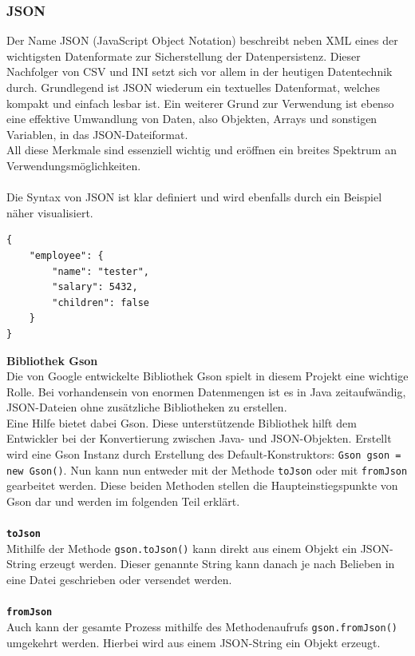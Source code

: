 \subsubsection{JSON}\label{sssec:json}
Der Name JSON (JavaScript Object Notation) beschreibt neben XML eines der wichtigsten Datenformate zur Sicherstellung der Datenpersistenz.
Dieser Nachfolger von CSV und INI setzt sich vor allem in der heutigen Datentechnik durch.
Grundlegend ist JSON wiederum ein textuelles Datenformat, welches kompakt und einfach lesbar ist.
Ein weiterer Grund zur Verwendung ist ebenso eine effektive Umwandlung von Daten, also Objekten, Arrays und sonstigen Variablen, in das JSON-Dateiformat.\\
All diese Merkmale sind essenziell wichtig und eröffnen ein breites Spektrum an Verwendungsmöglichkeiten.\\\\
\newpage
Die Syntax von JSON ist klar definiert und wird ebenfalls durch ein Beispiel näher visualisiert.
\begin{lstlisting}[style=json, caption=JSON-Codebeispiel,label=jsonExample]
{
    "employee": {
        "name": "tester",
        "salary": 5432,
        "children": false
    }
}
\end{lstlisting}
\textbf{Bibliothek Gson}\\
Die von Google entwickelte Bibliothek Gson spielt in diesem Projekt eine wichtige Rolle.
Bei vorhandensein von enormen Datenmengen ist es in Java zeitaufwändig, JSON-Dateien ohne zusätzliche Bibliotheken zu erstellen.\\
Eine Hilfe bietet dabei Gson.
Diese unterstützende Bibliothek hilft dem Entwickler bei der Konvertierung zwischen Java- und JSON-Objekten.
Erstellt wird eine Gson Instanz durch Erstellung des Default-Konstruktors: \lstinline[style=java]{Gson gson = new Gson()}.
Nun kann nun entweder mit der Methode \lstinline{toJson} oder mit \lstinline{fromJson} gearbeitet werden.
Diese beiden Methoden stellen die Haupteinstiegspunkte von Gson dar und werden im folgenden Teil erklärt.
\\\\
\textbf{\lstinline{toJson}}
\\
Mithilfe der Methode \lstinline[style=java]{gson.toJson()} kann direkt aus einem Objekt ein JSON-String erzeugt werden.
Dieser genannte String kann danach je nach Belieben in eine Datei geschrieben oder versendet werden.
\\\\
\textbf{\lstinline{fromJson}}
\\
Auch kann der gesamte Prozess mithilfe des Methodenaufrufs \lstinline[style=java]{gson.fromJson()} umgekehrt werden.
Hierbei wird aus einem JSON-String ein Objekt erzeugt.
\newpage
